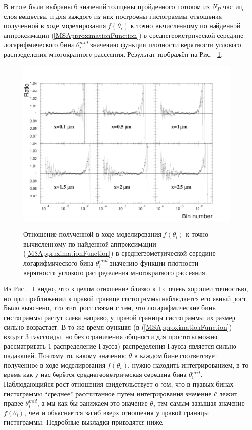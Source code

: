 \documentclass[a4paper,12pt]{article}
\begin{document}
\begin{large}
 	В итоге были выбраны 6 значений толщины пройденного потоком из $N_P$ частиц слоя вещества, и для каждого из них построены гистограммы отношения полученной в ходе моделирования $f(\theta_i)$ к точно вычисленному по найденной аппроксимации (\ref{MSApproximationFunction}) в среднегеометрической середине логарифмического бина $\theta^{mid}_i$ значению функции плотности верятности углового распределения многократного рассеяния.
 	Результат изображён на Рис. ~\ref{fig:MSRatioHistogramWithoutCorrection}.
 	
\begin{figure}[ht]
{
   \includegraphics[width=0.99\linewidth]{images/ratioms_without_correction.pdf}
}
\caption{Отношение полученной в ходе моделирования $f(\theta_i)$ к точно вычисленному по найденной аппроксимации (\ref{MSApproximationFunction}) в среднегеометрической середине логарифмического бина $\theta^{mid}_i$ значению функции плотности верятности углового распределения многократного рассеяния.}
\label{fig:MSRatioHistogramWithoutCorrection}
\end{figure}

	Из Рис. ~\ref{fig:MSRatioHistogramWithoutCorrection} видно, что в целом отношение близко к 1 с очень хорошей точностью, но при приближении к правой границе гистограммы наблюдается его явный рост.
	Было выяснено, что этот рост связан с тем, что логарифмические бины гистограммы растут слева направо, у правой границы гистограммы их размер сильно возрастает.
	В то же время функция (в (\ref{MSApproximationFunction}) входят 3 гауссоиды, но без ограничения общности для простоты можно рассматривать 1 распределение Гаусса) распределения Гаусса является сильно падающей.
	Поэтому то, какому значению $\theta$ в каждом бине соответсвует полученное в ходе моделирования $f(\theta_i)$, нужно находить интегрированием, в то время как у нас берётся среднегеометрическая середина бина $\theta^{mid}_i$.
	Наблюдающийся рост отношения свидетельствует о том, что в правых бинах гистограммы ``среднее'' рассчитанное путём интегрирования значение $\theta$ лежит правее $\theta^{mid}_i$, а мы как бы занижаем это значение $\theta$, тем самым завышая значение $f(\theta_i)$, чем и объясняется загиб вверх отношения у правой границы гистограммы. Подробные выкладки приводятся ниже.
  

\end{large}
\end{document}
